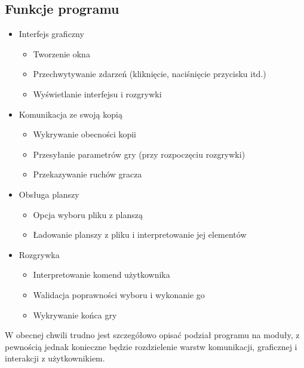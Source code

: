 \documentclass[10pt,a4paper]{report}
\begin{document}
\subsection*{Funkcje programu}
\begin{itemize}
\item Interfejs graficzny
	\begin{itemize}
	\item Tworzenie okna
	\item Przechwytywanie zdarzeń (kliknięcie, naciśnięcie przycisku itd.)
	\item Wyświetlanie interfejsu i rozgrywki
	\end{itemize}
\item Komunikacja ze swoją kopią
	\begin{itemize}
	\item Wykrywanie obecności kopii
	\item Przesyłanie parametrów gry (przy rozpoczęciu rozgrywki)
	\item Przekazywanie ruchów gracza
	\end{itemize}
\item Obsługa planszy
	\begin{itemize}
	\item Opcja wyboru pliku z planszą
	\item Ładowanie planszy z pliku i interpretowanie jej elementów
	\end{itemize}
\item Rozgrywka
	\begin{itemize}
	\item Interpretowanie komend użytkownika
	\item Walidacja poprawności wyboru i wykonanie go
	\item Wykrywanie końca gry
	\end{itemize}
	
\end{itemize}
W obecnej chwili trudno jest szczegółowo opisać podział programu na moduły, z pewnością jednak konieczne będzie rozdzielenie warstw komunikacji, graficznej i interakcji z użytkownikiem.
\end{document}
